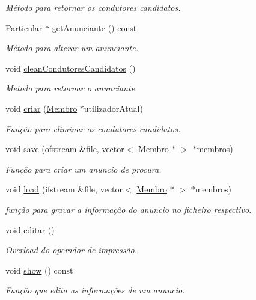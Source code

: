 \begin{DoxyCompactItemize}
\begin{DoxyCompactList}\small\item\em Método para retornar os condutores candidatos. \end{DoxyCompactList}\item 
\hyperlink{class_particular}{Particular} $\ast$ \hyperlink{class_anuncio_procura_aadc1d2f42fd3a9629498065b931e9134}{get\+Anunciante} () const 
\begin{DoxyCompactList}\small\item\em Método para alterar um anunciante. \end{DoxyCompactList}\item 
void \hyperlink{class_anuncio_procura_a7258f159f42bb53a3d7fe96f34e04280}{clean\+Condutores\+Candidatos} ()
\begin{DoxyCompactList}\small\item\em Metodo para retornar o anunciante. \end{DoxyCompactList}\item 
void \hyperlink{class_anuncio_procura_a73abd85989eee52b20c7ffca120ae5de}{criar} (\hyperlink{class_membro}{Membro} $\ast$utilizador\+Atual)
\begin{DoxyCompactList}\small\item\em Função para eliminar os condutores candidatos. \end{DoxyCompactList}\item 
void \hyperlink{class_anuncio_procura_a3e41646018004c3efb37c9dab3482c96}{save} (ofstream \&file, vector$<$ \hyperlink{class_membro}{Membro} $\ast$ $>$ $\ast$membros)
\begin{DoxyCompactList}\small\item\em Função para criar um anuncio de procura. \end{DoxyCompactList}\item 
void \hyperlink{class_anuncio_procura_a9983a05725bcdcee8aee8f778c79920b}{load} (ifstream \&file, vector$<$ \hyperlink{class_membro}{Membro} $\ast$ $>$ $\ast$membros)
\begin{DoxyCompactList}\small\item\em função para gravar a informação do anuncio no ficheiro respectivo. \end{DoxyCompactList}\item 
void \hyperlink{class_anuncio_procura_ae7ef0a393b385df69d7ee4d22a10e4ec}{editar} ()
\begin{DoxyCompactList}\small\item\em Overload do operador de impressão. \end{DoxyCompactList}\item 
void \hyperlink{class_anuncio_procura_a7a9ac26488642a35643f5322acf40788}{show} () const 
\begin{DoxyCompactList}\small\item\em Função que edita as informações de um anuncio. \end{DoxyCompactList}\end{DoxyCompactItemize}
